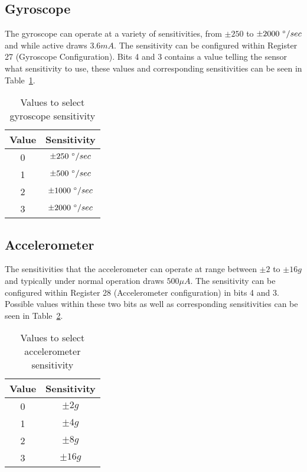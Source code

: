 \subsection{Gyroscope}

The gyroscope can operate at a variety of sensitivities, from $\pm 250$ to $\pm 2000~\degree / sec$ and while active draws $3.6mA$. The sensitivity can be configured within Register 27 (Gyroscope Configuration). Bits 4 and 3 contains a value telling the sensor what sensitivity to use, these values and corresponding sensitivities can be seen in Table~\ref{tab:gyro:range}. \cite{sensor_registers}

\begin{table}
	\centering
	\begin{tabular}{|c|c|}
		\hline
		Value & Sensitivity \\
		\hline
		0 & $\pm 250~\degree / sec$ \\
		1 & $\pm 500~\degree / sec$ \\
		2 & $\pm 1000~\degree / sec$ \\
		3 & $\pm 2000~\degree / sec$ \\
		\hline
	\end{tabular}
	\caption{Values to select gyroscope sensitivity}
	\label{tab:gyro:range}
\end{table}

\subsection{Accelerometer}

The sensitivities that the accelerometer can operate at range between $\pm 2$ to $\pm 16g$ and typically under normal operation draws $500\mu A$. The sensitivity can be configured within Register 28 (Accelerometer configuration) in bits 4 and 3. Possible values within these two bits as well as corresponding sensitivities can be seen in Table~\ref{tab:accel:range}. \cite{sensor_registers}

\begin{table}
	\centering
	\begin{tabular}{|c|c|}
		\hline
		Value & Sensitivity \\
		\hline
		0 & $\pm 2g$ \\
		1 & $\pm 4g$ \\
		2 & $\pm 8g$ \\
		3 & $\pm 16g$ \\
		\hline
	\end{tabular}
	\caption{Values to select accelerometer sensitivity}
	\label{tab:accel:range}
\end{table}

